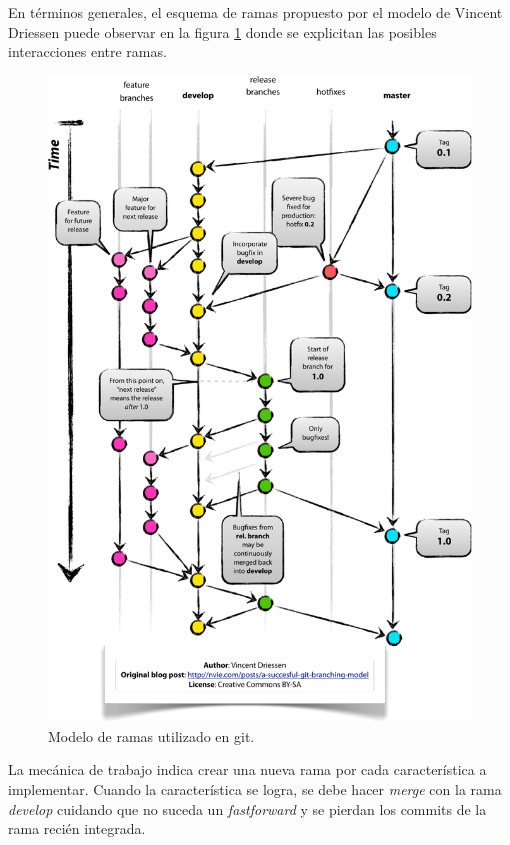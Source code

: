 En términos generales, el esquema de ramas propuesto por el modelo de Vincent Driessen puede observar en la figura  \ref{fig:branching} donde se explicitan las posibles interacciones entre ramas.

\vfill

\begin{figure}[!htbp]
	\centering
	\includegraphics[width=.9\textwidth]{./Figures/Git-branching-model.pdf}
	\caption[Modelo de ramas utilizado en git]{Modelo de ramas utilizado en git\protect\footnotemark.}
	\label{fig:branching}
\end{figure}


La mecánica de trabajo indica crear una nueva rama por cada característica a implementar.  Cuando la característica se logra, se debe hacer \textit{merge} con la rama \textit{develop} cuidando que no suceda un \textit{fastforward} y se pierdan los commits de la rama recién integrada.

